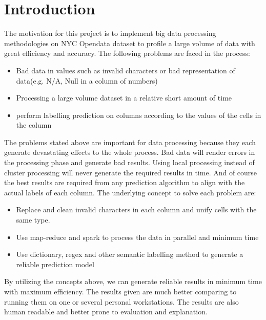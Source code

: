 \documentclass[sigconf]{acmart}
\begin{document}
\section{Introduction}
The motivation for this project is to implement big data processing methodologies on NYC Opendata dataset to profile a large volume of data with great efficiency and accuracy. The following problems are faced in the process:
\begin{itemize}
\item Bad data in values such as invalid characters or bad representation of data(e.g. N/A, Null in a column of numbers)
\item Processing a large volume dataset in a relative short amount of time
\item perform labelling prediction on columns according to the values of the cells in the column
\end{itemize}
The problems stated above are important for data processing because they each generate devastating effects to the whole process. Bad data will render errors in the processing phase and generate bad results. Using local processing instead of cluster processing will never generate the required results in time. And of course the best results are required from any prediction algorithm to align with the actual labels of each column.
The underlying concept to solve each problem are:
\begin{itemize}
\item Replace and clean invalid characters in each column and unify cells with the same type. 
\item Use map-reduce and spark to process the data in parallel and minimum time
\item Use dictionary, regex and other semantic labelling method to generate a reliable prediction model
\end{itemize}
By utilizing the concepts above, we can generate reliable results in minimum time with maximum efficiency. The results given are much better comparing to running them on one or several personal workstations. The results are also human readable and better prone to evaluation and explanation.


\end{document}
